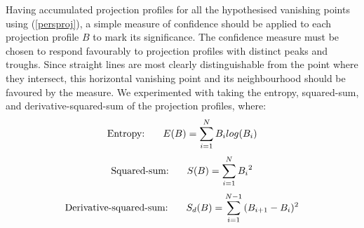 



Having accumulated projection profiles for all the hypothesised vanishing points
using (\ref{persproj}), a simple measure of confidence should be
applied to each projection profile $B$ to mark its significance.
The confidence measure must be chosen to respond favourably to projection profiles
with distinct peaks and troughs.
Since straight lines are most clearly distinguishable from the point where they
intersect, this horizontal vanishing point and its neighbourhood should be
favoured by the measure. We experimented with taking the entropy, squared-sum, and
derivative-squared-sum of the projection profiles, where:
\begin{equation} \mbox{Entropy: } \hspace*{5mm} E(B) = \sum_{i=1}^{N}{B_{i} log(B_{i})} \end{equation}
\begin{equation} \mbox{Squared-sum: } \hspace*{5mm} S(B) = \sum_{i=1}^{N}{{B_{i}}^{2}} \end{equation}
\begin{equation} \mbox{Derivative-squared-sum: } \hspace*{5mm} S_d(B) = \sum_{i=1}^{N-1}{{(B_{i+1}-B_{i}})^{2}} \end{equation}

